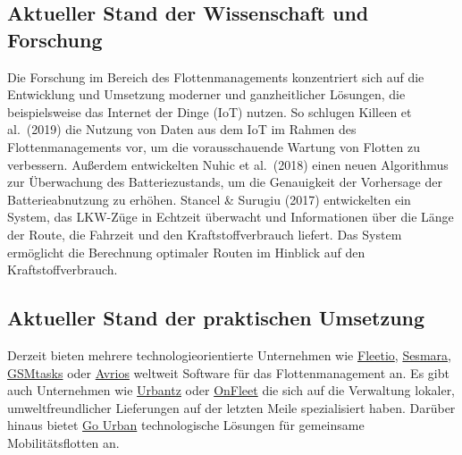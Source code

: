 \documentclass[
]{book}
\begin{document}
\hypertarget{aktueller-stand-der-wissenschaft-und-forschung-16}{%
\subsection*{Aktueller Stand der Wissenschaft und Forschung}\label{aktueller-stand-der-wissenschaft-und-forschung-16}}

Die Forschung im Bereich des Flottenmanagements konzentriert sich auf die Entwicklung und Umsetzung moderner und ganzheitlicher Lösungen, die beispielsweise das Internet der Dinge (IoT) nutzen. So schlugen Killeen et al.~(2019) die Nutzung von Daten aus dem IoT im Rahmen des Flottenmanagements vor, um die vorausschauende Wartung von Flotten zu verbessern. Außerdem entwickelten Nuhic et al.~(2018) einen neuen Algorithmus zur Überwachung des Batteriezustands, um die Genauigkeit der Vorhersage der Batterieabnutzung zu erhöhen. Stancel \& Surugiu (2017) entwickelten ein System, das LKW-Züge in Echtzeit überwacht und Informationen über die Länge der Route, die Fahrzeit und den Kraftstoffverbrauch liefert. Das System ermöglicht die Berechnung optimaler Routen im Hinblick auf den Kraftstoffverbrauch.

\hypertarget{aktueller-stand-der-praktischen-umsetzung-16}{%
\subsection*{Aktueller Stand der praktischen Umsetzung}\label{aktueller-stand-der-praktischen-umsetzung-16}}

Derzeit bieten mehrere technologieorientierte Unternehmen wie \href{https://www.fleetio.com/}{Fleetio}, \href{https://www.samsara.com/at/}{Sesmara}, \href{https://gsmtasks.com/}{GSMtasks} oder \href{https://www.avrios.com/?utm_source=capterra\&utm_medium=cpc\&utm_campaign=software-comparison}{Avrios} weltweit Software für das Flottenmanagement an. Es gibt auch Unternehmen wie \href{https://www.urbantz.com/}{Urbantz} oder \href{https://onfleet.com/}{OnFleet} die sich auf die Verwaltung lokaler, umweltfreundlicher Lieferungen auf der letzten Meile spezialisiert haben. Darüber hinaus bietet \href{https://gourban.co/}{Go Urban} technologische Lösungen für gemeinsame Mobilitätsflotten an.
\end{document}
